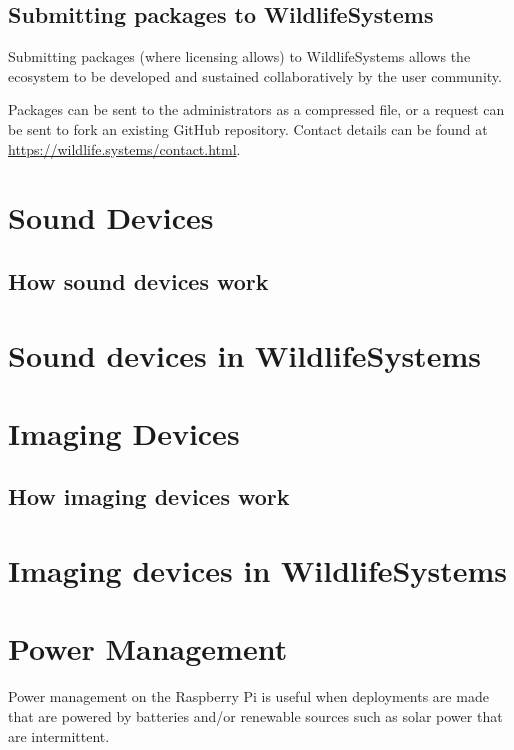 \documentclass[
]{book}
\begin{document}
\section{Submitting packages to WildlifeSystems}\label{submitting-packages-to-wildlifesystems}

Submitting packages (where licensing allows) to WildlifeSystems allows the ecosystem to be developed and sustained collaboratively by the user community.

Packages can be sent to the administrators as a compressed file, or a request can be sent to fork an existing GitHub repository. Contact details can be found at \url{https://wildlife.systems/contact.html}.

\chapter{Sound Devices}\label{sound-devices}

\section{How sound devices work}\label{how-sound-devices-work}

\chapter{Sound devices in WildlifeSystems}\label{sound-devices-in-wildlifesystems}

\chapter{Imaging Devices}\label{imaging-devices}

\section{How imaging devices work}\label{how-imaging-devices-work}

\chapter{Imaging devices in WildlifeSystems}\label{imaging-devices-in-wildlifesystems}

\chapter{Power Management}\label{power-management}

Power management on the Raspberry Pi is useful when deployments are made that are powered by batteries and/or renewable sources such as solar power that are intermittent.
\end{document}
